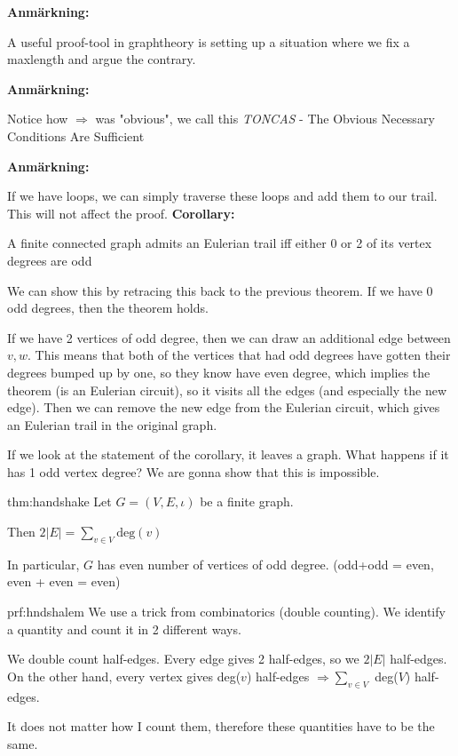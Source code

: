 \par\bigskip
\noindent\textbf{Anmärkning:}\par
\noindent A useful proof-tool in graphtheory is setting up a situation where we fix a maxlength and argue the contrary.
\par\bigskip
\noindent\textbf{Anmärkning:}\par
\noindent Notice how $\Rightarrow$ was "obvious", we call this \textit{TONCAS} - The Obvious Necessary Conditions Are Sufficient
\par\bigskip
\noindent\textbf{Anmärkning:}\par
\noindent If we have loops, we can simply traverse these loops and add them to our trail. This will not affect the proof.
\noindent\textbf{Corollary:}\par
\noindent A finite connected graph admits an Eulerian trail iff either 0 or 2 of its vertex degrees are odd
\par\bigskip
\noindent We can show this by retracing this back to the previous theorem. If we have 0 odd degrees, then the theorem holds.\par
\noindent If we have 2 vertices of odd degree, then we can draw an additional edge between $v,w$. This means that both of the vertices that had odd degrees have gotten their degrees bumped up by one, so they know have even degree, which implies the theorem (is an Eulerian circuit), so it visits all the edges (and especially the new edge). Then we can remove the new edge from the Eulerian circuit, which gives an Eulerian trail in the original graph.
\par\bigskip
\noindent If we look at the statement of the corollary, it leaves a graph. What happens if it has 1 odd vertex degree? We are gonna show that this is impossible.
\par\bigskip
\begin{theo}{thm:handshake}
  Let $G = (V,E,\iota)$ be a finite graph.\par
  \noindent Then $2\left|E\right| = \sum_{v\in V}\text{deg}(v)$
  \par\bigskip
  \noindent In particular, $G$ has even number of vertices of odd degree. (odd+odd = even, even + even = even)
\end{theo}
\par\bigskip
\begin{prf}{prf:hndshalem}
  We use a trick from combinatorics (double counting). We identify a quantity and count it in 2 different ways.
  \par\bigskip
  \noindent We double count half-edges. Every edge gives 2 half-edges, so we $2\left|E\right|$ half-edges. On the other hand, every vertex gives deg($v$) half-edges $\Rightarrow \sum_{v\in V}$ deg($V$) half-edges.\par
  \noindent It does not matter how I count them, therefore these quantities have to be the same.
\end{prf}
